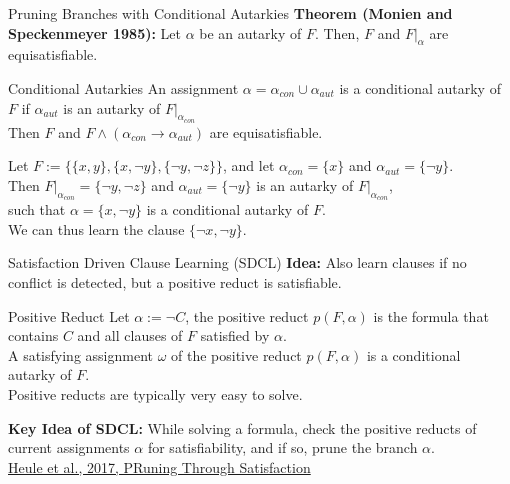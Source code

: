\documentclass[t]{sdqbeamer}
\begin{document}
\begin{frame}{Pruning Branches with Conditional Autarkies}
\textbf{Theorem (Monien and Speckenmeyer 1985):}
Let $\alpha$ be an autarky of $F$. Then, $F$ and $F|_\alpha$ are equisatisfiable.\\[1ex]

\begin{block}{Conditional Autarkies}
An assignment $\alpha = \alpha_{con} \cup \alpha_{aut}$ is a conditional autarky of $F$ if $\alpha_{aut}$ is an autarky of $F|_{\alpha_{con}}$\\[1ex]
Then $F$ and $F \land (\alpha_{con} \rightarrow \alpha_{aut})$ are equisatisfiable.\\[1ex]
\end{block}
\begin{example}
Let $F := \{\{x, y\}, \{x, \lnot y\}, \{\lnot y, \lnot z\}\}$, and let $\alpha_{con} = \{x\}$ and $\alpha_{aut} = \{\lnot y\}$.\\[1ex]
Then $F|_{\alpha_{con}} = \{\lnot y, \lnot z\}$ and $\alpha_{aut} = \{\lnot y\}$ is an autarky of $F|_{\alpha_{con}}$,\\ such that $\alpha = \{x, \lnot y\}$ is a conditional autarky of $F$.\\[1ex]
We can thus learn the clause $\{\lnot x, \lnot y\}$.
\end{example}
\end{frame}


\begin{frame}{Satisfaction Driven Clause Learning (SDCL)}
\textbf{Idea:} Also learn clauses if no conflict is detected, but a positive reduct is satisfiable.\\[1ex]

\begin{block}{Positive Reduct}
Let $\alpha := \lnot C$, the positive reduct $p(F, \alpha)$ is the formula that contains $C$ and all clauses of $F$ satisfied by $\alpha$.\\[1ex]
A satisfying assignment $\omega$ of the positive reduct $p(F,\alpha)$ is a conditional autarky of $F$.\\[1em]
Positive reducts are typically very easy to solve.
\end{block}
\textbf{Key Idea of SDCL:} While solving a formula, check the positive reducts of current assignments $\alpha$ for satisfiability, and if so, prune the branch $\alpha$.\\[1em]
\href{https://doi.org/10.1007/978-3-319-70389-3_12}{Heule et al., 2017, PRuning Through Satisfaction}
\end{frame}
\end{document}

